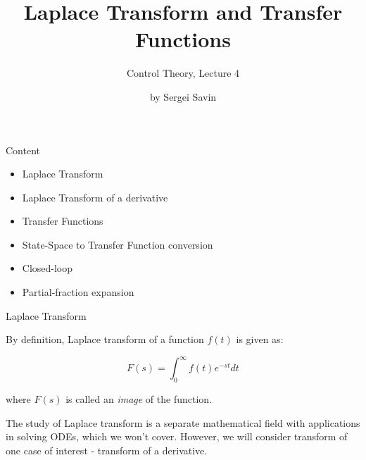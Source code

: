 \documentclass{beamer}
\title{Laplace Transform and Transfer Functions}
\subtitle{Control Theory, Lecture 4}
\author{by Sergei Savin}
\date{\mydate}
\begin{document}
\maketitle


\begin{frame}{Content}

\begin{itemize}
\item Laplace Transform
\item Laplace Transform of a derivative
\item Transfer Functions
\item State-Space to Transfer Function conversion
\item Closed-loop
\item Partial-fraction expansion
\end{itemize}

\end{frame}




\begin{frame}{Laplace Transform}
\begin{flushleft}

By definition, Laplace transform of a function $f(t)$ is given as:

\begin{equation}
    F(s) = \int_0^\infty f(t) e^{-st}dt
\end{equation}

where $F(s)$ is called an \emph{image} of the function.

\bigskip

The study of Laplace transform is a separate mathematical field with applications in solving ODEs, which we won't cover. However, we will consider transform of one case of interest - transform of a derivative. 

\end{flushleft}
\end{frame}
\end{document}
